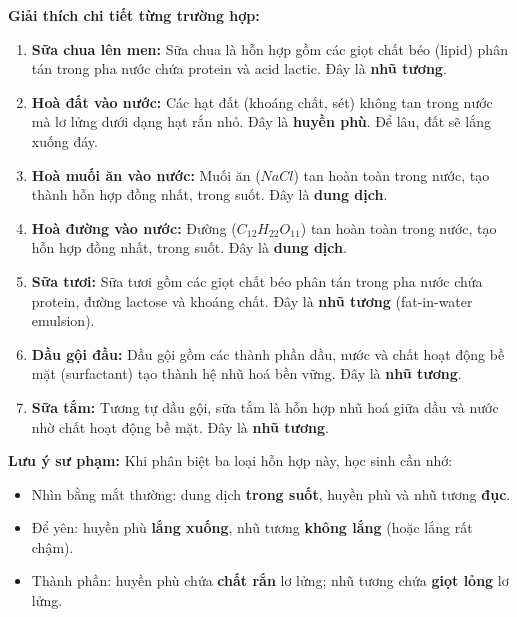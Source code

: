\begin{bt}
{\textbf{Giải thích chi tiết từng trường hợp:}

\begin{enumerate}
    \item \textbf{Sữa chua lên men:} Sữa chua là hỗn hợp gồm các giọt chất béo (lipid) phân tán trong pha nước chứa protein và acid lactic. Đây là \textbf{nhũ tương}.

    \item \textbf{Hoà đất vào nước:} Các hạt đất (khoáng chất, sét) không tan trong nước mà lơ lửng dưới dạng hạt rắn nhỏ. Đây là \textbf{huyền phù}. Để lâu, đất sẽ lắng xuống đáy.

    \item \textbf{Hoà muối ăn vào nước:} Muối ăn ($NaCl$) tan hoàn toàn trong nước, tạo thành hỗn hợp đồng nhất, trong suốt. Đây là \textbf{dung dịch}.

    \item \textbf{Hoà đường vào nước:} Đường ($C_{12}H_{22}O_{11}$) tan hoàn toàn trong nước, tạo hỗn hợp đồng nhất, trong suốt. Đây là \textbf{dung dịch}.

    \item \textbf{Sữa tươi:} Sữa tươi gồm các giọt chất béo phân tán trong pha nước chứa protein, đường lactose và khoáng chất. Đây là \textbf{nhũ tương} (fat-in-water emulsion).

    \item \textbf{Dầu gội đầu:} Dầu gội gồm các thành phần dầu, nước và chất hoạt động bề mặt (surfactant) tạo thành hệ nhũ hoá bền vững. Đây là \textbf{nhũ tương}.

    \item \textbf{Sữa tắm:} Tương tự dầu gội, sữa tắm là hỗn hợp nhũ hoá giữa dầu và nước nhờ chất hoạt động bề mặt. Đây là \textbf{nhũ tương}.
\end{enumerate}

\textbf{Lưu ý sư phạm:}
Khi phân biệt ba loại hỗn hợp này, học sinh cần nhớ:
\begin{itemize}
    \item Nhìn bằng mắt thường: dung dịch \textbf{trong suốt}, huyền phù và nhũ tương \textbf{đục}.
    \item Để yên: huyền phù \textbf{lắng xuống}, nhũ tương \textbf{không lắng} (hoặc lắng rất chậm).
    \item Thành phần: huyền phù chứa \textbf{chất rắn} lơ lửng; nhũ tương chứa \textbf{giọt lỏng} lơ lửng.
\end{itemize}
}
\end{bt}
